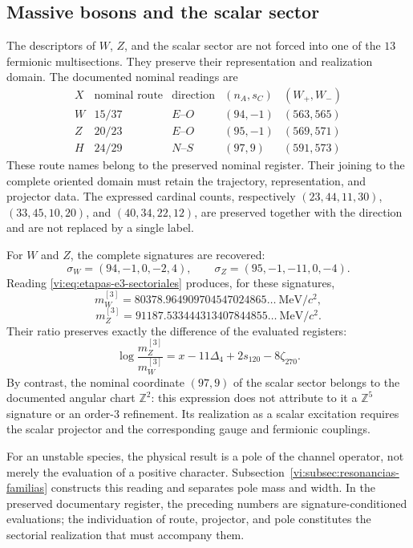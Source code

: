 \subsection{Massive bosons and the scalar sector}
\label{vi:subsec:bosones-familias}

The descriptors of \(W\), \(Z\), and the scalar sector are not forced
into one of the \(13\) fermionic multisections. They preserve their
representation and realization domain. The documented nominal
readings are
\[
\begin{array}{c|c|c|c|c}
 X&\text{nominal route}&\text{direction}&(n_A,s_C)&(W_+,W_-)\\\hline
 W&15/37&E\text{--}O&(94,-1)&(563,565)\\
 Z&20/23&E\text{--}O&(95,-1)&(569,571)\\
 H&24/29&N\text{--}S&(97,9)&(591,573)
\end{array}
\]
These route names belong to the preserved nominal register. Their
joining to the complete oriented domain must retain the trajectory,
representation, and projector data. The expressed cardinal counts,
respectively \((23,44,11,30)\), \((33,45,10,20)\), and
\((40,34,22,12)\), are preserved together with the direction and are not
replaced by a single label.

For \(W\) and \(Z\), the complete signatures are recovered:
\[
 \sigma_W=(94,-1,0,-2,4),\qquad
 \sigma_Z=(95,-1,-11,0,-4).
\]
Reading \eqref{vi:eq:etapas-e3-sectoriales} produces, for these signatures,
\[
 m_W^{[3]}=80378.964909704547024865\ldots\ \mathrm{MeV}/c^2,
\]
\[
 m_Z^{[3]}=91187.533444313407844855\ldots\ \mathrm{MeV}/c^2.
\]
Their ratio preserves exactly the difference of the evaluated registers:
\[
 \log\frac{m_Z^{[3]}}{m_W^{[3]}}
 =x-11\Delta_4+2s_{120}-8\zeta_{270}.
\]
By contrast, the nominal coordinate \((97,9)\) of the scalar sector belongs
to the documented angular chart \(\mathbb Z^2\): this expression does not
attribute to it a \(\mathbb Z^5\) signature or an order-\(3\)
refinement. Its realization as a scalar excitation requires the scalar
projector and the corresponding gauge and fermionic couplings.

For an unstable species, the physical result is a pole of the channel
operator, not merely the evaluation of a positive character.
Subsection~\ref{vi:subsec:resonancias-familias} constructs this reading and
separates pole mass and width. In the preserved documentary register,
the preceding numbers are signature-conditioned evaluations;
the individuation of route, projector, and pole constitutes the sectorial
realization that must accompany them.

